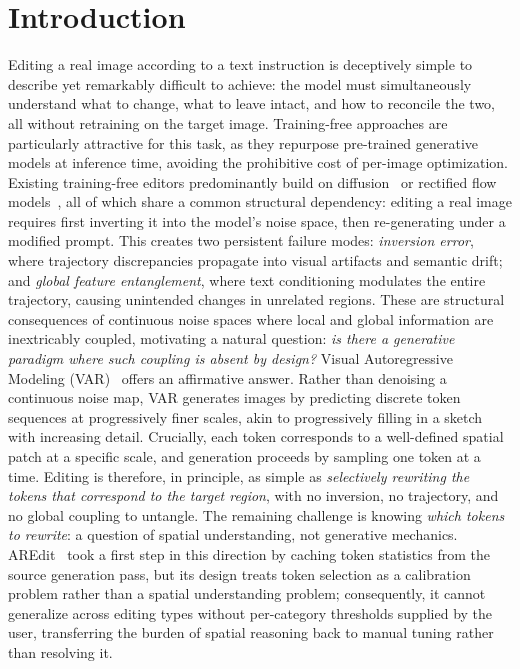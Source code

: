 \section{Introduction}

Editing a real image according to a text instruction is deceptively simple to describe yet remarkably difficult to achieve: the model must simultaneously understand what to change, what to leave intact, and how to reconcile the two, all without retraining on the target image. Training-free approaches are particularly attractive for this task, as they repurpose pre-trained generative models at inference time, avoiding the prohibitive cost of per-image optimization.
Existing training-free editors predominantly build on diffusion~\cite{prompt2prompt,Null-text,PnP,PnP_Inversion,masactrl,pix2pix-zero,LEDits++} or rectified flow models~\cite{Flowedit,RF-inversion,ReFlex,FireFlow}, all of which share a common structural dependency: editing a real image requires first inverting it into the model's noise space, then re-generating under a modified prompt. This creates two persistent failure modes: \textit{inversion error}, where trajectory discrepancies propagate into visual artifacts and semantic drift; and \textit{global feature entanglement}, where text conditioning modulates the entire trajectory, causing unintended changes in unrelated regions. These are structural consequences of continuous noise spaces where local and global information are inextricably coupled, motivating a natural question: \textit{is there a generative paradigm where such coupling is absent by design?}
Visual Autoregressive Modeling (VAR)~\cite{VAR} offers an affirmative answer. Rather than denoising a continuous noise map, VAR generates images by predicting discrete token sequences at progressively finer scales, akin to progressively filling in a sketch with increasing detail. Crucially, each token corresponds to a well-defined spatial patch at a specific scale, and generation proceeds by sampling one token at a time. Editing is therefore, in principle, as simple as \textit{selectively rewriting the tokens that correspond to the target region}, with no inversion, no trajectory, and no global coupling to untangle. The remaining challenge is knowing \textit{which tokens to rewrite}: a question of spatial understanding, not generative mechanics. AREdit~\cite{AREdit} took a first step in this direction by caching token statistics from the source generation pass, but its design treats token selection as a calibration problem rather than a spatial understanding problem; consequently, it cannot generalize across editing types without per-category thresholds supplied by the user, transferring the burden of spatial reasoning back to manual tuning rather than resolving it.
